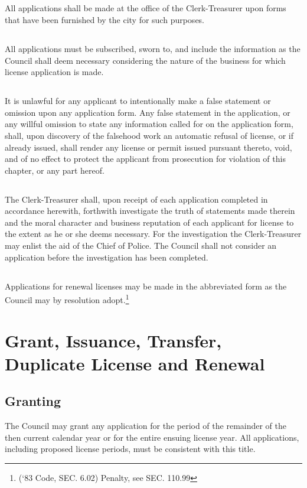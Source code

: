 \subsection{}
All applications shall be made at the office of the Clerk-Treasurer upon forms that have been furnished by the city for such purposes.
\subsection{}
All applications must be subscribed, sworn to, and include the information as the Council shall deem necessary considering the nature of the business for which license application is made.
\subsection{}
It is unlawful for any applicant to intentionally make a false statement or omission upon any application form.  Any false statement in the application, or any willful omission to state any information called for on the application form, shall, upon discovery of the falsehood work an automatic refusal of license, or if already issued, shall render any license or permit issued pursuant thereto, void, and of no effect to protect the applicant from prosecution for violation of this chapter, or any part hereof.
\subsection{}
The Clerk-Treasurer shall, upon receipt of each application completed in accordance herewith, forthwith investigate the truth of statements made therein and the moral character and business reputation of each applicant for license to the extent as he or she deems necessary.  For the investigation the Clerk-Treasurer may enlist the aid of the Chief of Police.  The Council shall not consider an application before the investigation has been completed.
\subsection{}
Applications for renewal licenses may be made in the abbreviated form as the Council may by resolution adopt.\footnote{(‘83 Code, SEC. 6.02)  Penalty, see SEC. 110.99}

\section{Grant, Issuance, Transfer, Duplicate License and Renewal}
\subsection{Granting}
The Council may grant any application for the period of the remainder of the then current calendar year or for the entire ensuing license year.  All applications, including proposed license periods, must be consistent with this title.
